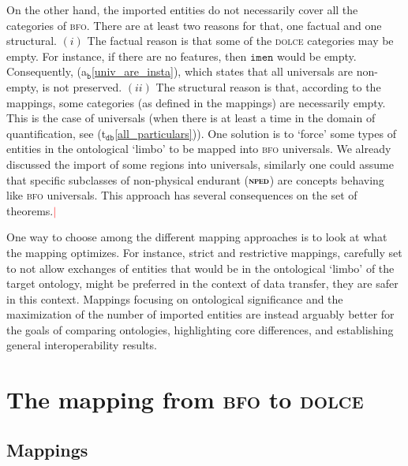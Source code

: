 \documentclass[ao]{iosart2x}
\newcommand{\nb}[1]{\textcolor{red}{$|$}\marginpar{\hspace*{-0cm}\parbox{20mm}{\scriptsize\raggedright\textcolor{red}{#1}}}}
\newcommand{\bfoAxLabel}{\textrm{a$_\texttt{b}$}}
\newcommand{\dbThrLabel}{\textrm{t$_\texttt{db}$}}
\newcommand{\refbfoax}[1]{({\bfoAxLabel}\ref{#1})}
\newcommand{\refdbth}[1]{({\dbThrLabel}\ref{#1})}
\newcommand{\cn}[1]{\mathtt{#1}}
\newcommand{\dolce}{{\textsc{dolce}}}
\newcommand{\bfo}{{\textsc{bfo}}}
\newcommand {\NPEDdcat} {\textsc{nped}}
\newcommand{\imenbcat}{\cn{imen}}
\begin{document}
On the other hand, the imported entities do not necessarily cover all the categories of {\bfo}. There are at least two reasons for that, one factual and one structural. $(i)$ The factual reason is that some of the {\dolce} categories may be empty. For instance, if there are no features, then $\imenbcat$ would be empty. Consequently, \refbfoax{univ_are_insta}, which states that all universals are non-empty, is not preserved. $(ii)$ The structural reason is that, according to the mappings, some categories (as defined in the mappings) are necessarily empty. %
  This is the case of universals (when there is at least a time in the domain of quantification, see \refdbth{all_particulars}). One solution is to `force' some types of entities in the ontological `limbo' to be mapped into {\bfo} universals. We already discussed the import of some regions into universals, similarly one could assume that specific subclasses of non-physical endurant ($\NPEDdcat$) are concepts behaving like {\bfo} universals. This approach has several consequences on the set of theorems.\nb{CM: ci sarebbero un sacco di altre osservazioni da fare sui teoremi che non seguono%
\\
SB: lascierei così almeno per ora}


One way to choose among the different mapping approaches is to look at what the mapping optimizes. For instance, strict and restrictive mappings, carefully set to not allow exchanges of entities that would be in the ontological `limbo' of the target ontology, might be preferred in the context of data transfer, they are safer in this context. Mappings focusing on ontological significance and the maximization of the number of imported entities are instead arguably better for the goals of comparing ontologies, highlighting core differences, and establishing general interoperability results.

\section{The mapping from {\bfo} to {\dolce}}\label{sect_b2d}

\subsection{Mappings}\label{sect_mappings_b2d}
\end{document}
